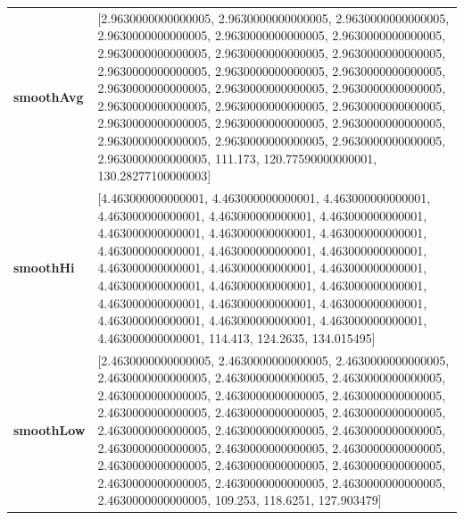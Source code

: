 				\begin{table}[H]
					\centering
					\begin{tabularx}{\textwidth}{lX}
		\textbf{smoothAvg}&  [2.9630000000000005, 2.9630000000000005, 2.9630000000000005, 2.9630000000000005, 2.9630000000000005, 2.9630000000000005, 2.9630000000000005, 2.9630000000000005, 2.9630000000000005, 2.9630000000000005, 2.9630000000000005, 2.9630000000000005, 2.9630000000000005, 2.9630000000000005, 2.9630000000000005, 2.9630000000000005, 2.9630000000000005, 2.9630000000000005, 2.9630000000000005, 2.9630000000000005, 2.9630000000000005, 2.9630000000000005, 2.9630000000000005, 2.9630000000000005, 2.9630000000000005, 111.173, 120.77590000000001, 130.28277100000003] \\
		\textbf{smoothHi}& [4.463000000000001, 4.463000000000001, 4.463000000000001, 4.463000000000001, 4.463000000000001, 4.463000000000001, 4.463000000000001, 4.463000000000001, 4.463000000000001, 4.463000000000001, 4.463000000000001, 4.463000000000001, 4.463000000000001, 4.463000000000001, 4.463000000000001, 4.463000000000001, 4.463000000000001, 4.463000000000001, 4.463000000000001, 4.463000000000001, 4.463000000000001, 4.463000000000001, 4.463000000000001, 4.463000000000001, 4.463000000000001, 114.413, 124.2635, 134.015495] \\
		\textbf{smoothLow} &[2.4630000000000005, 2.4630000000000005, 2.4630000000000005, 2.4630000000000005, 2.4630000000000005, 2.4630000000000005, 2.4630000000000005, 2.4630000000000005, 2.4630000000000005, 2.4630000000000005, 2.4630000000000005, 2.4630000000000005, 2.4630000000000005, 2.4630000000000005, 2.4630000000000005, 2.4630000000000005, 2.4630000000000005, 2.4630000000000005, 2.4630000000000005, 2.4630000000000005, 2.4630000000000005, 2.4630000000000005, 2.4630000000000005, 2.4630000000000005, 2.4630000000000005, 109.253, 118.6251, 127.903479]\\
		
		
	\end{tabularx} 
\end{table}

